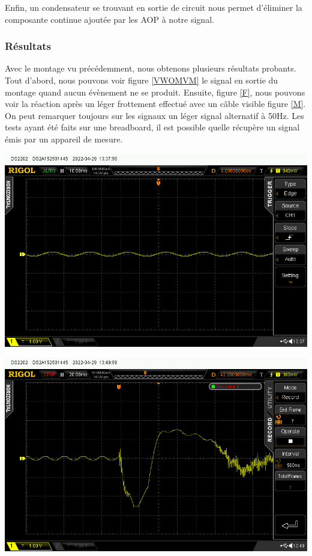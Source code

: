 \documentclass[12pt,french,a4paper]{article}
\begin{document}
Enfin, un condensateur se trouvant en sortie de circuit nous permet d’éliminer la composante continue ajoutée par les AOP à notre signal.


\subsubsection{Résultats}
Avec le montage vu précédemment, nous obtenons plusieurs résultats probants.
Tout d'abord, nous pouvons voir figure \ref{VWOMVM} le signal en sortie du montage quand aucun évènement ne se produit.
Ensuite, figure \ref{F}, nous pouvons voir la réaction après un léger frottement effectué avec un câble visible figure \ref{M}. 
On peut remarquer toujours sur les signaux un léger signal alternatif à 50Hz. Les tests ayant été faits sur une breadboard, il est possible quelle récupère un signal émis par un appareil de mesure.

\begin{center}	
\includegraphics[scale=0.5]{../img/plat.jpg}
\label{VWOMVM}
\end{center}

\begin{center}	
\includegraphics[scale=0.5]{../img/frotment.jpg}
\label{F}
\end{center}
\end{document}

